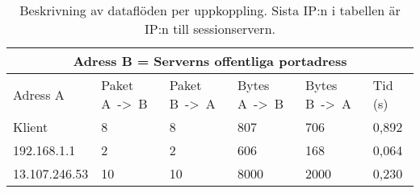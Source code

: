 \documentclass[journal,comsoc]{IEEEtran}
\begin{document}
\begin{table} [H]
  \begin{center}
    \label{table:server:externconn:banned}
    \begin{tabular}{ | m{1.5cm} |  m{1cm} | m{1cm}| m{1cm}|m{1cm}|m{0.5cm}| } 
      \hline
      \multicolumn{6}{|c|}{Adress B = Serverns offentliga portadress} \\
      \hline
      Adress A & Paket A~->~B & Paket B~->~A & Bytes A~->~B & Bytes B~->~A & Tid (s) \\
      \hline
      Klient & 8 & 8 & 807 & 706 & 0,892\\
      \hline   
      192.168.1.1 & 2 & 2 & 606 & 168 & 0,064 \\
      \hline
      13.107.246.53 & 10 & 10 & 8000 & 2000 & 0,230 \\
      \hline 
    \end{tabular}
  \end{center}
  \caption{Beskrivning av dataflöden per uppkoppling. Sista IP:n i tabellen är IP:n till sessionservern.}
\end{table}
\end{document}
